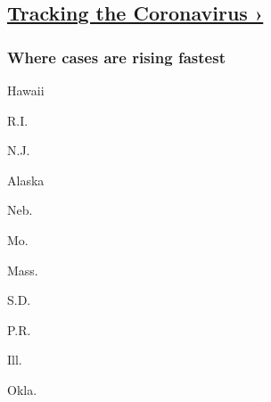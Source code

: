 \hypertarget{tracking-the-coronavirus-}{%
\subsection{\texorpdfstring{\href{https://www.nytimes3xbfgragh.onion/interactive/2020/us/coronavirus-us-cases.html}{Tracking
the Coronavirus
›}}{Tracking the Coronavirus ›}}\label{tracking-the-coronavirus-}}

\href{https://www.nytimes3xbfgragh.onion/interactive/2020/us/coronavirus-us-cases.html}{}

\hypertarget{where-cases-are-rising-fastest}{%
\subsubsection{\texorpdfstring{Where cases are \textbf{rising}
fastest}{Where cases are rising fastest}}\label{where-cases-are-rising-fastest}}

\href{https://www.nytimes3xbfgragh.onion/interactive/2020/us/hawaii-coronavirus-cases.html}{}

Hawaii
\href{https://www.nytimes3xbfgragh.onion/interactive/2020/us/rhode-island-coronavirus-cases.html}{}

R.I.
\href{https://www.nytimes3xbfgragh.onion/interactive/2020/us/new-jersey-coronavirus-cases.html}{}

N.J.
\href{https://www.nytimes3xbfgragh.onion/interactive/2020/us/alaska-coronavirus-cases.html}{}

Alaska
\href{https://www.nytimes3xbfgragh.onion/interactive/2020/us/nebraska-coronavirus-cases.html}{}

Neb.
\href{https://www.nytimes3xbfgragh.onion/interactive/2020/us/missouri-coronavirus-cases.html}{}

Mo.
\href{https://www.nytimes3xbfgragh.onion/interactive/2020/us/massachusetts-coronavirus-cases.html}{}

Mass.
\href{https://www.nytimes3xbfgragh.onion/interactive/2020/us/south-dakota-coronavirus-cases.html}{}

S.D.
\href{https://www.nytimes3xbfgragh.onion/interactive/2020/us/puerto-rico-coronavirus-cases.html}{}

P.R.
\href{https://www.nytimes3xbfgragh.onion/interactive/2020/us/illinois-coronavirus-cases.html}{}

Ill.
\href{https://www.nytimes3xbfgragh.onion/interactive/2020/us/oklahoma-coronavirus-cases.html}{}

Okla.
\href{https://www.nytimes3xbfgragh.onion/interactive/2020/us/maryland-coronavirus-cases.html}{}

